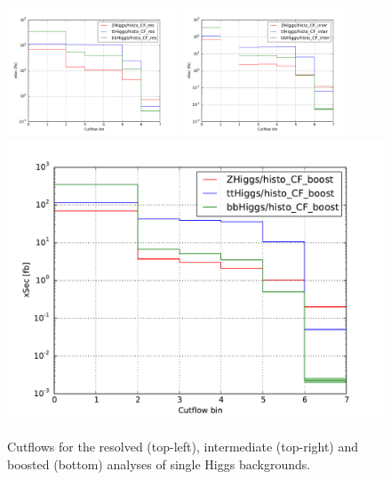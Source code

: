 \documentclass[11pt]{article}
\begin{document}
\begin{figure}
\begin{center}
\includegraphics[width=0.45\textwidth]{plots/res.pdf}
\includegraphics[width=0.45\textwidth]{plots/inter.pdf}
\includegraphics[width=\textwidth]{plots/boost.pdf}
\caption{Cutflows for the resolved (top-left), intermediate (top-right) and boosted (bottom) analyses of single Higgs backgrounds.}
\end{center}
\end{figure}
\end{document}
